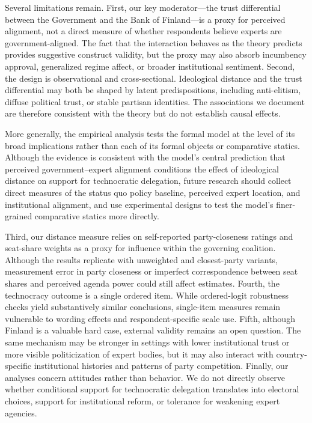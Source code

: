 \documentclass[11pt]{article}\usepackage[]{graphicx}\usepackage[]{xcolor}
\begin{document}
Several limitations remain. First, our key moderator---the trust differential between the Government and the Bank of Finland---is a proxy for perceived alignment, not a direct measure of whether respondents believe experts are government-aligned. The fact that the interaction behaves as the theory predicts provides suggestive construct validity, but the proxy may also absorb incumbency approval, generalized regime affect, or broader institutional sentiment. Second, the design is observational and cross-sectional. Ideological distance and the trust differential may both be shaped by latent predispositions, including anti-elitism, diffuse political trust, or stable partisan identities. The associations we document are therefore consistent with the theory but do not establish causal effects.

More generally, the empirical analysis tests the formal model at the level of its broad implications rather than each of its formal objects or comparative statics. Although the evidence is consistent with the model's central prediction that perceived government--expert alignment conditions the effect of ideological distance on support for technocratic delegation, future research should collect direct measures of the status quo policy baseline, perceived expert location, and institutional alignment, and use experimental designs to test the model's finer-grained comparative statics more directly.

Third, our distance measure relies on self-reported party-closeness ratings and seat-share weights as a proxy for influence within the governing coalition. Although the results replicate with unweighted and closest-party variants, measurement error in party closeness or imperfect correspondence between seat shares and perceived agenda power could still affect estimates. Fourth, the technocracy outcome is a single ordered item. While ordered-logit robustness checks yield substantively similar conclusions, single-item measures remain vulnerable to wording effects and respondent-specific scale use. Fifth, although Finland is a valuable hard case, external validity remains an open question. The same mechanism may be stronger in settings with lower institutional trust or more visible politicization of expert bodies, but it may also interact with country-specific institutional histories and patterns of party competition. Finally, our analyses concern attitudes rather than behavior. We do not directly observe whether conditional support for technocratic delegation translates into electoral choices, support for institutional reform, or tolerance for weakening expert agencies.
\end{document}
